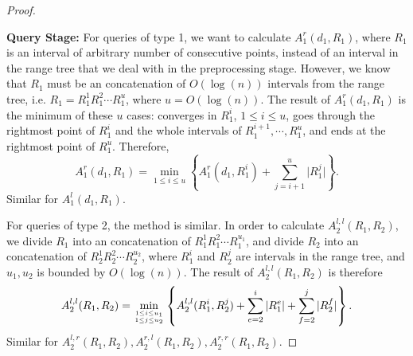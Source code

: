 \documentclass[11pt]{article}
\theoremstyle{plain}
\theoremstyle{definition}
\newcommand{\abs}[1]{\vert{#1}\vert}
\newcommand{\zdd}[1]{{#1}^{l}}
\begin{document}
\begin{proof}
\begin{center}
 \end{center}

\noindent\textbf{Query Stage:} For queries of type 1, we want to calculate $A_1^r(d_1,R_1)$, where $R_1$ is an interval of arbitrary number of consecutive points, instead of an interval in the range tree that we deal with in the preprocessing stage. However, we know that $R_1$ must be an concatenation of $O(\log(n))$ intervals from the range tree, i.e. $R_1=R_1^1R_1^2\cdots R_1^u$, where $u=O(\log(n)).$ The result of $A_1^r(d_1,R_1)$ is the minimum of these $u$ cases: converges in $R_1^i$, $1\le i\le u$, goes through the rightmost point of $R_1^i$ and the whole intervals of $R_1^{i+1},\cdots,R_1^u$, and ends at the rightmost point of $R_1^u$. Therefore,
\begin{equation}
A_1^r(d_1,R_1)=\min_{1\le i\le u}\left\{A_1^r(d_1,R_1^i)+\sum_{j=i+1}^u\abs{R_1^j}\right\}.
\end{equation}
Similar for $A_1^l(d_1,R_1).$

For queries of type 2, the method is similar. In order to calculate $A_2^{l,l}(R_1,R_2)$, we divide $R_1$ into an concatenation of $R_1^1R_1^2\cdots R_1^{u_1}$, and divide $R_2$ into an concatenation of $R_2^1R_2^2\cdots R_2^{u_2}$, where $R_1^i$ and $R_2^j$ are intervals in the range tree, and $u_1,u_2$ is bounded by $O(\log(n)).$ The result of $A_2^{l,l}(R_1,R_2)$ is therefore
\begin{equation}
A_2^{l,l}(R_1,R_2)=\min_{{1\le i\le u_1 \atop 1\le j\le u_2}}\left\{A_2^{l,l}(R_1^i,R_2^j)+\sum_{e=2}^{i}\abs{R_1^e}+\sum_{f=2}^{j}\abs{R_2^f}\right\}.
\end{equation}
Similar for $A_2^{l,r}(R_1,R_2),A_2^{r,l}(R_1,R_2),A_2^{r,r}(R_1,R_2).$


\end{proof}
\end{document}
